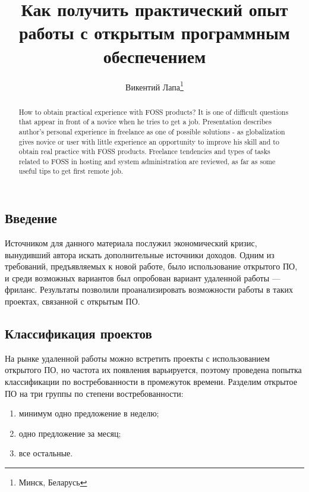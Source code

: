 \documentclass[10pt, a5paper]{article}
\begin{document}
\title{Как получить практический опыт работы с открытым программным обеспечением}%

\author{Викентий Лапа\footnote{Минск, Беларусь}}
\maketitle

\begin{abstract}
How to obtain practical experience with FOSS products? It is one of difficult questions that appear in front of a novice when he tries to get a job. Presentation describes author's personal experience in freelance as one of possible solutions - as globalization gives novice or user with little experience an opportunity to improve his skill and to obtain real practice with FOSS products. Freelance tendencies and types of tasks related to FOSS in hosting and system administration are reviewed, as far as some useful tips  to get first remote job.
\end{abstract}

\subsection*{Введение}

Источником для данного материала послужил экономический кризис, вынудивший автора искать дополнительные источники доходов. Одним из требований, предъявляемых к новой работе, было использование открытого ПО, и среди возможных вариантов был опробован вариант удаленной работы --- фриланс. Результаты позволили проанализировать возможности работы в таких проектах, связанной с открытым ПО.

\subsection*{Классификация проектов}

На рынке удаленной работы можно встретить проекты с использованием открытого ПО, но частота их появления варьируется, поэтому проведена попытка классификации по востребованности в промежуток времени. 
Разделим открытое ПО на три группы по степени востребованности:

\begin{enumerate}
  \item минимум одно предложение в неделю;
  \item одно предложение за месяц;
  \item все остальные.
\end{enumerate}
\end{document}
